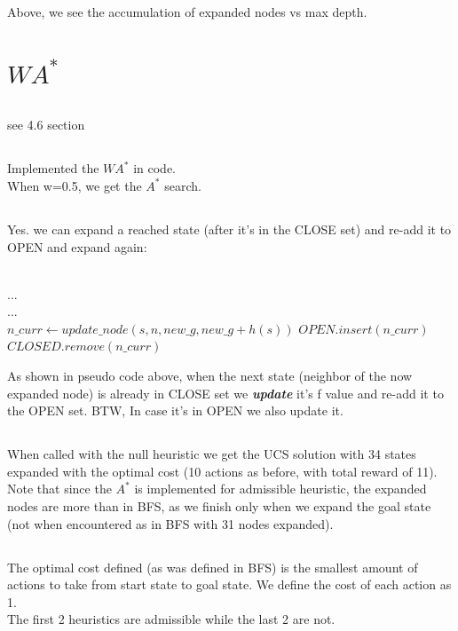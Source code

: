 \documentclass[12pt]{article}
\begin{document}
Above, we see the accumulation of expanded nodes vs max depth.

\section{$WA^*$}
\subsection{}
see 4.6 section
\subsection{}
Implemented the $WA^*$ in code.\\
When w=0.5, we get the $A^*$ search.
\subsection{}
Yes. we can expand a reached state (after it's in the CLOSE set) and re-add it to OPEN and expand again:\\
\begin{algorithmic}
\\
    ...
\\
    ...
\Else {}\\
        \State $n\_curr \gets update\_node(s, n, new\_g ,new\_g + h(s))$
        \State $OPEN.insert(n\_curr)$
        \State $CLOSED.remove(n\_curr)$
    \EndIf
\EndIf 
\end{algorithmic}
As shown in pseudo code above, when the next state (neighbor of the now expanded node) is already in CLOSE set we {\textit{\textbf{update}}} it's f value and re-add it to the OPEN set.
BTW, In case it's in OPEN we also update it.

\subsection{}
When called with the null heuristic we get the UCS solution with 34 states expanded with the optimal cost (10 actions as before, with total reward of 11). Note that since the $A^*$ is implemented for admissible heuristic, the expanded nodes are more than in BFS, as we finish only when we expand the goal state (not when encountered as in BFS with 31 nodes expanded).

\subsection{}
The optimal cost defined (as was defined in BFS) is the smallest amount of actions to take from start state to goal state. We define the cost of each action as 1.\\
The first 2 heuristics are admissible while the last 2 are not.\\
\end{document}
